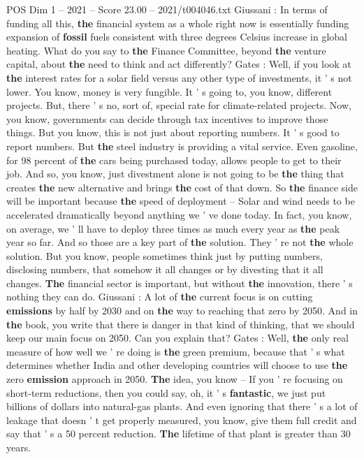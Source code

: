 \begin{textsample}{POS Dim 1 – 2021 – Score 23.00 – 2021/t004046.txt}
Giussani : In terms of funding all this, \textbf{the} financial system as a whole right now is essentially funding expansion of \textbf{fossil} fuels consistent with three degrees Celsius increase in global heating.
What do you say to \textbf{the} Finance Committee, beyond \textbf{the} venture capital, about \textbf{the} need to think and act differently?
Gates : Well, if you look at \textbf{the} interest rates for a solar field versus any other type of investments, it ' s not lower.
You know, money is very fungible.
It ' s going to, you know, different projects.
But, there ' s no, sort of, special rate for climate-related projects.
Now, you know, governments can decide through tax incentives to improve those things.
But you know, this is not just about reporting numbers.
It ' s good to report numbers.
But \textbf{the} steel industry is providing a vital service.
Even gasoline, for 98 percent of \textbf{the} cars being purchased today, allows people to get to their job.
And so, you know, just divestment alone is not going to be \textbf{the} thing that creates \textbf{the} new alternative and brings \textbf{the} cost of that down.
So \textbf{the} finance side will be important because \textbf{the} speed of deployment -- Solar and wind needs to be accelerated dramatically beyond anything we ' ve done today.
In fact, you know, on average, we ' ll have to deploy three times as much every year as \textbf{the} peak year so far.
And so those are a key part of \textbf{the} solution.
They ' re not \textbf{the} whole solution.
But you know, people sometimes think just by putting numbers, disclosing numbers, that somehow it all changes or by divesting that it all changes. \textbf{The} financial sector is important, but without \textbf{the} innovation, there ' s nothing they can do.
Giussani : A lot of \textbf{the} current focus is on cutting \textbf{emissions} by half by 2030 and on \textbf{the} way to reaching that zero by 2050.
And in \textbf{the} book, you write that there is danger in that kind of thinking, that we should keep our main focus on 2050.
Can you explain that?
Gates : Well, \textbf{the} only real measure of how well we ' re doing is \textbf{the} green premium, because that ' s what determines whether India and other developing countries will choose to use \textbf{the} zero \textbf{emission} approach in 2050. \textbf{The} idea, you know -- If you ' re focusing on short-term reductions, then you could say, oh, it ' s \textbf{fantastic}, we just put billions of dollars into natural-gas plants.
And even ignoring that there ' s a lot of leakage that doesn ' t get properly measured, you know, give them full credit and say that ' s a 50 percent reduction. \textbf{The} lifetime of that plant is greater than 30 years.

\end{textsample}
